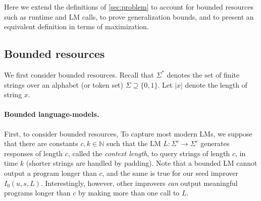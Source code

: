 \documentclass{article} %
\newcommand{\sol}{{s}}
\begin{document}
Here we extend the definitions of \cref{sec:problem} to account for bounded resources such as runtime and LM calls, to prove generalization bounds, and to present an equivalent definition in terms of maximization.

\subsection{Bounded resources}

We first consider bounded resources. Recall that $\Sigma^*$ denotes the set of finite strings over an alphabet (or token set) $\Sigma \supseteq \{0,1\}$. Let $|x|$ denote the length of string $x$. 

\paragraph{Bounded language-models.}
First, to consider bounded resources, To capture most modern LMs, we suppose that there are constants $c, k \in \mathbb{N}$ such that the LM $L:\Sigma^c\rightarrow \Sigma^c$ generates responses of length $c$, called the \textit{context length}, to query strings of length $c$, in time $k$ (shorter strings are handled by padding). 
Note that a bounded LM cannot output a program longer than $c$, and the same is true for our seed improver $I_0(u, \sol, L)$. Interestingly, however, other improvers \textit{can} output meaningful programs longer than $c$ by making more than one call to $L$. 
\end{document}
